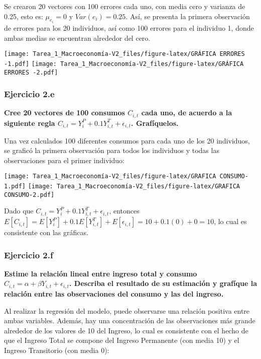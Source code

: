 \documentclass[
]{article}
\begin{document}
Se crearon 20 vectores con 100 errores cada uno, con media cero y
varianza de 0.25, esto es: \(\mu_{e_{i}} = 0\) y \(Var(e_{i}) = 0.25\).
Así, se presenta la primera observación de errores para los 20
individuos, así como 100 errores para el individuo 1, donde ambas medias
se encuentran alrededor del cero.

\texttt{[image: Tarea\_1\_Macroeconomía-V2\_files/figure-latex/GRÁFICA ERRORES -1.pdf]}
\texttt{[image: Tarea\_1\_Macroeconomía-V2\_files/figure-latex/GRÁFICA ERRORES -2.pdf]}
\newpage

\hypertarget{ejercicio-2.e}{%
\subsubsection{Ejercicio 2.e}\label{ejercicio-2.e}}

\textbf{Cree 20 vectores de 100 consumos \(C_{i,t}\) cada uno, de
acuerdo a la siguiente regla
\(C_{i,t}=Y_i^P+0.1Y_{i,t}^T+\epsilon_{i,t}\). Grafíquelos.}

Una vez calculados 100 diferentes consumos para cada uno de los 20
individuos, se graficó la primera observación para todos los individuos
y todas las observaciones para el primer individuo:

\texttt{[image: Tarea\_1\_Macroeconomía-V2\_files/figure-latex/GRAFICA CONSUMO-1.pdf]}
\texttt{[image: Tarea\_1\_Macroeconomía-V2\_files/figure-latex/GRAFICA CONSUMO-2.pdf]}

Dado que \(C_{i,t}=Y_i^P+0.1Y_{i,t}^T+\epsilon_{i,t}\), entonces
\(E[C_{i,t}] = E[Y_i^P] + 0.1E[Y_{i,t}^T] + E[\epsilon_{i,t}] = 10 + 0.1(0) + 0 = 10\),
lo cual es consistente con las gráficas.

\newpage

\hypertarget{ejercicio-2.f}{%
\subsubsection{Ejercicio 2.f}\label{ejercicio-2.f}}

\textbf{Estime la relación lineal entre ingreso total y consumo
\(C_{i,t}=\alpha+\beta Y_{i,t}+\epsilon_{i,t}\). Describa el resultado
de su estimación y grafíque la relación entre las observaciones del
consumo y las del ingreso.}

Al realizar la regresión del modelo, puede observarse una relación
positiva entre ambas variables. Además, hay una concentración de las
observaciones más grande alrededor de los valores de 10 del Ingreso, lo
cual es consistente con el hecho de que el Ingreso Total se compone del
Ingreso Permanente (con media 10) y el Ingreso Transitorio (con media
0):
\end{document}
